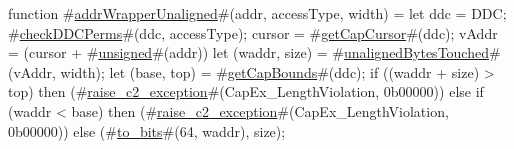 function #\hyperref[sailMIPSzaddrWrapperUnaligned]{addrWrapperUnaligned}#(addr, accessType, width) =
  {
    let ddc = DDC;
    #\hyperref[sailMIPSzcheckDDCPerms]{checkDDCPerms}#(ddc, accessType);
    cursor = #\hyperref[sailMIPSzgetCapCursor]{getCapCursor}#(ddc);
    vAddr  = (cursor + #\hyperref[sailMIPSzunsigned]{unsigned}#(addr)) %
    let (waddr, size) = #\hyperref[sailMIPSzunalignedBytesTouched]{unalignedBytesTouched}#(vAddr, width);
    let (base, top) = #\hyperref[sailMIPSzgetCapBounds]{getCapBounds}#(ddc);
    if ((waddr + size) > top) then
      (#\hyperref[sailMIPSzraisezyc2zyexception]{raise\_c2\_exception}#(CapEx_LengthViolation, 0b00000))
    else if (waddr < base) then
      (#\hyperref[sailMIPSzraisezyc2zyexception]{raise\_c2\_exception}#(CapEx_LengthViolation, 0b00000))
    else
      (#\hyperref[sailMIPSztozybits]{to\_bits}#(64, waddr), size);
  }
